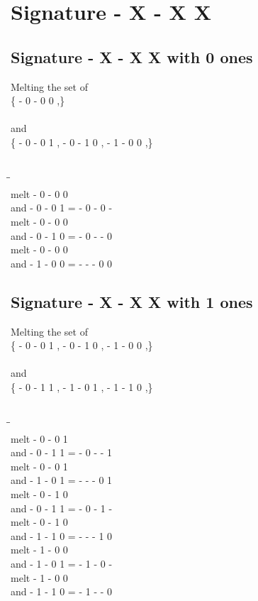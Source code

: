 \documentclass{article}
\begin{document}
\section{Signature - X - X X }
\subsection{Signature - X - X X with 0 ones}
Melting the set of\\
\{ -  0  -  0  0 ,\}\\\\
and\\
\{ -  0  -  0  1 , -  0  -  1  0 , -  1  -  0  0 ,\}\\\\
\begin{tabbing}
\hspace{3cm}\=\hspace{3cm}\=\hspace{3cm}\\[1cm]
melt\> -  0  -  0  0 \\
and\> -  0  -  0  1 \>
 =  -  0  -  0  - \\[1mm]
melt\> -  0  -  0  0 \\
and\> -  0  -  1  0 \>
 =  -  0  -  -  0 \\[1mm]
melt\> -  0  -  0  0 \\
and\> -  1  -  0  0 \>
 =  -  -  -  0  0 \\[1mm]
\end{tabbing}
\newpage
\subsection{Signature - X - X X with 1 ones}
Melting the set of\\
\{ -  0  -  0  1 , -  0  -  1  0 , -  1  -  0  0 ,\}\\\\
and\\
\{ -  0  -  1  1 , -  1  -  0  1 , -  1  -  1  0 ,\}\\\\
\begin{tabbing}
\hspace{3cm}\=\hspace{3cm}\=\hspace{3cm}\\[1cm]
melt\> -  0  -  0  1 \\
and\> -  0  -  1  1 \>
 =  -  0  -  -  1 \\[1mm]
melt\> -  0  -  0  1 \\
and\> -  1  -  0  1 \>
 =  -  -  -  0  1 \\[1mm]
melt\> -  0  -  1  0 \\
and\> -  0  -  1  1 \>
 =  -  0  -  1  - \\[1mm]
melt\> -  0  -  1  0 \\
and\> -  1  -  1  0 \>
 =  -  -  -  1  0 \\[1mm]
melt\> -  1  -  0  0 \\
and\> -  1  -  0  1 \>
 =  -  1  -  0  - \\[1mm]
melt\> -  1  -  0  0 \\
and\> -  1  -  1  0 \>
 =  -  1  -  -  0 \\[1mm]
\end{tabbing}
\newpage
\end{document}
